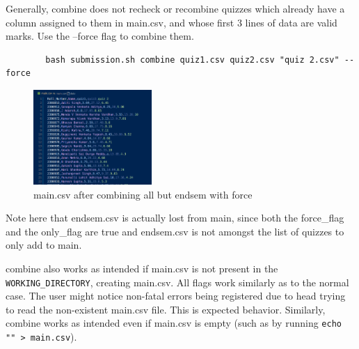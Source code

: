 \documentclass{article}
\begin{document}
    Generally, combine does not recheck or recombine quizzes which already have a column assigned to them in main.csv, and whose first 3 lines of data are valid marks. Use the --force flag to combine them.
    \begin{lstlisting}
        bash submission.sh combine quiz1.csv quiz2.csv "quiz 2.csv" --force
    \end{lstlisting}
    \begin{figure}[htbp]
        \centering
        \includegraphics[width=0.4\textwidth]{Force_flag}
        \caption{main.csv after combining all but endsem with force}
        \label{fig:combine_quiz1_force}
    \end{figure}
    Note here that endsem.csv is actually lost from main, since both the force\_flag and the only\_flag are true and endsem.csv is not amongst the list of quizzes to only add to main.
        
    combine also works as intended if main.csv is not present in the \texttt{WORKING\_DIRECTORY}, creating main.csv. All flags work similarly as to the normal case. The user might notice non-fatal errors being registered due to head trying to read the non-existent main.csv file. This is expected behavior.
    Similarly, combine works as intended even if main.csv is empty (such as by running \texttt{echo "" > main.csv}).
\end{document}
